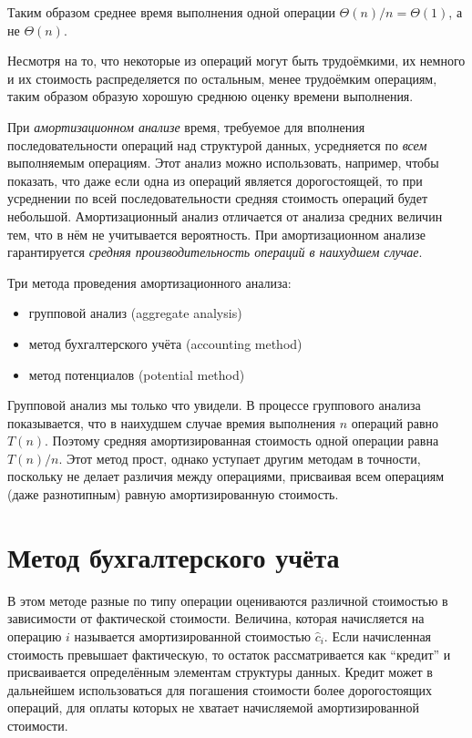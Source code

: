 \documentclass[a4paper,11pt]{article}
\begin{document}
Таким образом среднее время выполнения одной операции $\Theta(n) / n =
\Theta(1)$, а не $\Theta(n)$.

Несмотря на то, что некоторые из операций могут быть трудоёмкими, их немного и
их стоимость распределяется по остальным, менее трудоёмким операциям, таким
образом образую хорошую среднюю оценку времени выполнения.

При \emph{амортизационном анализе} время, требуемое для вполнения
последовательности операций над структурой данных, усредняется по \emph{всем}
выполняемым операциям. Этот анализ можно использовать, например, чтобы показать,
что даже если одна из операций является дорогостоящей, то при усреднении по всей
последовательности средняя стоимость операций будет небольшой. Амортизационный
анализ отличается от анализа средних величин тем, что в нём не учитывается
вероятность. При амортизационном анализе гарантируется \emph{средняя
производительность операций в наихудшем случае}.

Три метода проведения амортизационного анализа:

\begin{itemize}
\item групповой анализ (aggregate analysis)
\item метод бухгалтерского учёта (accounting method)
\item метод потенциалов (potential method)
\end{itemize}

Групповой анализ мы только что увидели. В процессе группового анализа
показывается, что в наихудшем случае времия выполнения $n$ операций равно $T(n)$.
Поэтому средняя амортизированная стоимость одной операции равна $T(n)/n$. Этот
метод прост, однако уступает другим методам в точности, поскольку не делает
различия между операциями, присваивая всем операциям (даже разнотипным) равную
амортизированную стоимость.

\section{Метод бухгалтерского учёта}

В этом методе разные по типу операции оцениваются различной стоимостью в
зависимости от фактической стоимости. Величина, которая начисляется на операцию
$i$ называется амортизированной стоимостью $\hat{c}_i$. Если начисленная
стоимость превышает фактическую, то остаток рассматривается как ``кредит'' и
присваивается определённым элементам структуры данных. Кредит может в дальнейшем
использоваться для погашения стоимости более дорогостоящих операций, для оплаты
которых не хватает начисляемой амортизированной стоимости.
\end{document}
